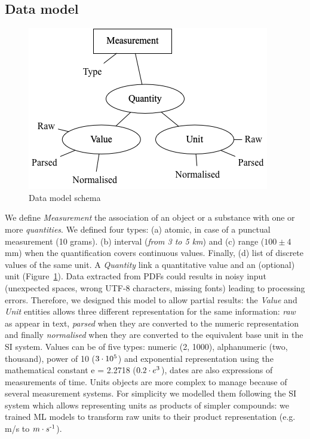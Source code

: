 \documentclass[sigconf]{acmart}
\begin{document}
\subsection{Data model}
\label{subsub:data-model}
\begin{figure}[ht]
  \centering
  \includegraphics[width=\linewidth]{images/schema-2}
  \caption{Data model schema}
  \label{fig:data-model-schema-2}
\end{figure}
We define \textit{Measurement} the association of an object or a substance with one or more \textit{quantities}. We defined four types: (a) atomic, in case of a punctual measurement (10 grams). (b) interval (\textit{from 3 to 5 km}) and (c) range ($100 \pm 4$ mm) when the quantification covers continuous values. Finally, (d) list of discrete values of the same unit. A \textit{Quantity} link a  quantitative value and an (optional) unit (Figure~\ref{fig:data-model-schema-2}). 
Data extracted from PDFs could results in noisy input (unexpected spaces, wrong UTF-8 characters, missing fonts) leading to processing errors. Therefore, we designed this model to allow partial results: the \textit{Value} and \textit{Unit} entities allows three different representation for the same information: \textit{raw} as appear in text, \textit{parsed} when they are converted to the numeric representation and finally \textit{normalised} when they are converted to the equivalent base unit in the SI system. Values can be of five types: numeric (2, 1000), alphanumeric (two, thousand), power of 10 ($3\cdot10\textsuperscript{5}$) and exponential representation using the mathematical constant e = 2.2718 ($0.2\cdot e\textsuperscript{3}$), dates are also expressions of measurements of time. Units objects are more complex to manage because of several measurement systems. For simplicity we modelled them following the SI system which allows representing units as products of simpler compounds: we trained ML models to transform raw units to their product representation (e.g. m/s to $m \cdot s\textsuperscript{-1}$).
\end{document}
